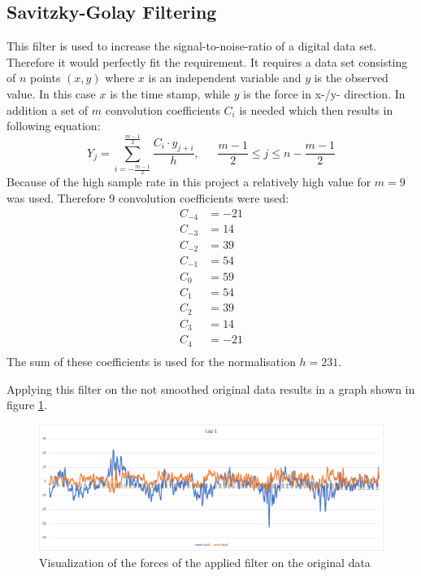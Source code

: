 \subsection{Savitzky-Golay Filtering}
This filter is used to increase the signal-to-noise-ratio of a digital data set\cite{sg}. Therefore it would perfectly fit the requirement. It requires a data set consisting of $n$ points $(x,y)$ where $x$ is an independent variable and $y$ is the observed value. In this case $x$ is the time stamp, while $y$ is the force in x-/y- direction. In addition a set of $m$ convolution coefficients $C_i$ is needed which then results in following equation:
\begin{equation*}
	Y_j = \sum_{i=-\frac{m-1}{2}}^{\frac{m-1}{2}}\dfrac{C_i\cdot y_{j+i}}{h},~~~~~~~ \dfrac{m-1}{2}\leq j \leq n-\dfrac{m-1}{2}
\end{equation*}
Because of the high sample rate in this project a relatively high value for $m=9$ was used. Therefore 9 convolution coefficients were used:
\begin{equation*}
	\begin{split}
	C_{-4} & = -21\\
	C_{-3} & = 14\\
	C_{-2} & = 39\\
	C_{-1} & = 54\\
	C_{0} & = 59   \\
	C_{1} & = 54     \\
	C_{2} & = 39     \\
	C_{3} & = 14     \\
	C_{4} & = -21    \\
	\end{split}
\end{equation*}
The sum of these coefficients is used for the normalisation $h=231$.

Applying this filter on the not smoothed original data results in a graph shown in figure \ref{fig:sgoriFor}.

\begin{figure}[H]
	\centering
	\includegraphics[scale= 0.45]{Pictures/sgoriForces.png}
	\caption{Visualization of the forces of the applied filter on the original data}
	\label{fig:sgoriFor}
\end{figure}


